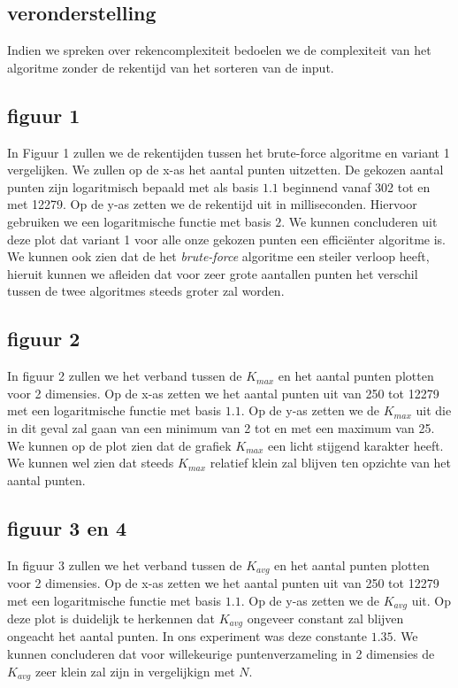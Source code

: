 \documentclass[12pt]{article}
\begin{document}
\subsection{veronderstelling}
Indien we spreken over rekencomplexiteit bedoelen we de complexiteit van het algoritme zonder de rekentijd van het sorteren van de input.

\subsection{figuur 1}
In Figuur 1 zullen we de rekentijden tussen het brute-force algoritme en variant 1 vergelijken.
We zullen op de x-as het aantal punten uitzetten.
De gekozen aantal punten zijn logaritmisch bepaald met als basis $1.1$ beginnend vanaf 302 tot en met 12279.
Op de y-as zetten we de rekentijd uit in milliseconden. Hiervoor gebruiken we een logaritmische functie met basis $2$.
We kunnen concluderen uit deze plot dat variant 1 voor alle onze gekozen punten een efficiënter algoritme is.
We kunnen ook zien dat de het \textit{brute-force} algoritme een steiler verloop heeft, hieruit kunnen we afleiden dat voor zeer grote aantallen punten het verschil tussen de twee algoritmes steeds groter zal worden.

\subsection{figuur 2}
In figuur 2 zullen we het verband tussen de $K_{max}$ en het aantal punten plotten voor 2 dimensies.
Op de x-as zetten we het aantal punten uit van 250 tot 12279 met een logaritmische functie met basis $1.1$.
Op de y-as zetten we de $K_{max}$ uit die in dit geval zal gaan van een minimum van 2 tot en met een maximum van 25.
We kunnen op de plot zien dat de grafiek $K_{max}$ een licht stijgend karakter heeft.
We kunnen wel zien dat steeds $K_{max}$ relatief klein zal blijven ten opzichte van het aantal punten.

\subsection{figuur 3 en 4}
In figuur 3 zullen we het verband tussen de $K_{avg}$ en het aantal punten plotten voor 2 dimensies.
Op de x-as zetten we het aantal punten uit van 250 tot 12279 met een logaritmische functie met basis $1.1$.
Op de y-as zetten we de $K_{avg}$ uit.
Op deze plot is duidelijk te herkennen dat $K_{avg}$ ongeveer constant zal blijven ongeacht het aantal punten.
In ons experiment was deze constante $1.35$.
We kunnen concluderen dat voor willekeurige puntenverzameling in 2 dimensies de $K_{avg}$ zeer klein zal zijn in vergelijkign met $N$.
\end{document}
